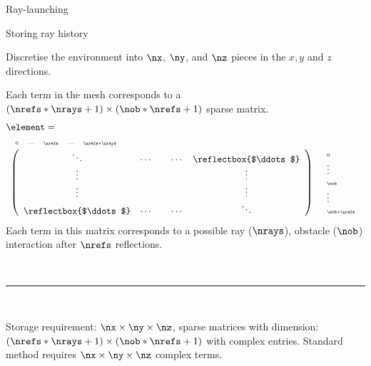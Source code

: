 \documentclass[8pt]{beamer}
\begin{document}
\begin{frame}{Ray-launching}
\begin{block}{Storing ray history}
\begin{minipage}{0.44\linewidth}
Discretise the environment into $\nx$, $\ny$, and $\nz$ pieces in the $x,y$ and $z$ directions.
\threedgrid
\end{minipage}%
\begin{minipage}{\sepwid}
\mbox{}
\end{minipage}%
\begin{minipage}{0.54\linewidth}
\pause
Each term in the mesh corresponds to a $(\nrefs*\nrays+1)\times (\nob *\nrefs+1)$ sparse matrix.
\begin{align*}
& \element= \\
& \begin{array}{l l}
\begin{array}{c c c c c}
\scriptscriptstyle{0} & \scriptscriptstyle{\cdots} & \scriptscriptstyle{\nrefs} & \scriptscriptstyle{\cdots} & \scriptscriptstyle{\nrefs*\nrays}
 \end{array} &
 \\
 \left(
\begin{array}{c c c c c}
 \ddots & \cdots &  & \cdots & \reflectbox{$\ddots$} 
 \\
\vdots & &  & & \vdots  \\
\vdots & &  & & \vdots \\
\reflectbox{$\ddots$} & \cdots & &  \cdots & \ddots 
\end{array}
 \right)
    & 
    \begin{array}{l}
    \scriptscriptstyle{0} \\ \vdots \\ \scriptscriptstyle{\nob}  \\ \vdots \\ \scriptscriptstyle{\nob*\nrefs}
  \end{array} \\
  \end{array}
\end{align*}
Each term in this matrix corresponds to a possible ray ($\nrays$), obstacle ($\nob$) interaction after $\nrefs$ reflections.
\end{minipage}
\\
\noindent\rule{\linewidth}{0.4pt}%
\\
\pause
\par Storage requirement: $\nx \times \ny \times \nz$, sparse matrices with dimension: $(\nrefs*\nrays+1)\times (\nob *\nrefs+1)$ with complex entries. Standard method requires $\nx \times \ny \times \nz$ complex terms.
\end{block}
\end{frame}
\end{document}
